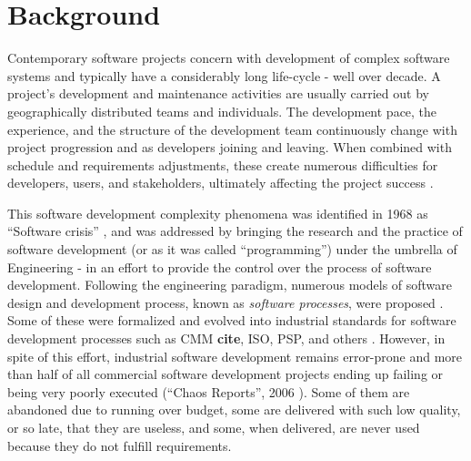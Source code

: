 \section{Background}\label{sec_background}
Contemporary software projects concern with development of complex software systems and typically have 
a considerably long life-cycle - well over decade.
A project's development and maintenance activities are usually carried out by geographically 
distributed teams and individuals. The development pace, the experience, and the structure of the 
development team continuously change with project progression and as developers joining and leaving. 
When combined with schedule and requirements adjustments, these create numerous difficulties 
for developers, users, and stakeholders, ultimately affecting the project success \cite{citeulike:2207657}. 

This software development complexity phenomena was identified in 1968 as ``Software crisis'' 
\cite{naur_crisis_68}, and was addressed by bringing the research and the practice of software development 
(or as it was called ``programming'') under the umbrella of Engineering - in an effort to provide 
the control over the process of software development. 
Following the engineering paradigm, numerous models of software design and development 
process, known as \textit{software processes}, were proposed \cite{citeulike:10002165}.
Some of these were formalized and evolved into industrial standards for software development processes 
such as CMM \textbf{cite}, ISO, PSP, and others \cite{citeulike:5043104}. 
However, in spite of this effort, industrial software  development remains error-prone and more 
than half of all commercial software development projects ending up failing or being very poorly executed 
(``Chaos Reports'', 2006 \cite{chaos2006}). Some of them are abandoned due to running 
over budget, some are delivered with such low quality, or so late, that they are useless, and some, 
when delivered, are never used because they do not fulfill requirements. 


